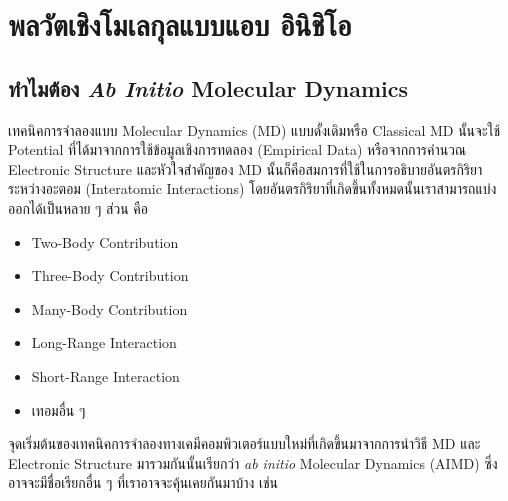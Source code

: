 

\chapter{พลวัตเชิงโมเลกุลแบบแอบ อินิชิโอ}
\label{ch:aimd}

\section{ทำไมต้อง \textit{Ab Initio} Molecular Dynamics}

เทคนิคการจำลองแบบ Molecular Dynamics (MD) แบบดั้งเดิมหรือ Classical MD นั้นจะใช้ Potential ที่ได้มาจากการใช้ข้อมูลเชิงการทดลอง
(Empirical Data) หรือจากการคำนวณ Electronic Structure และหัวใจสำคัญของ MD นั้นก็คือสมการที่ใช้ในการอธิบายอันตรกิริยาระหว่างอะตอม
(Interatomic Interactions) โดยอันตรกิริยาที่เกิดขึ้นทั้งหมดนั้นเราสามารถแบ่งออกได้เป็นหลาย ๆ ส่วน คือ

\begin{itemize}[topsep=0pt,noitemsep]
  \setlength\itemsep{0.5em}
  \item Two-Body Contribution

  \item Three-Body Contribution

  \item Many-Body Contribution

  \item Long-Range Interaction

  \item Short-Range Interaction

  \item เทอมอื่น ๆ
\end{itemize}

จุดเริ่มต้นของเทคนิคการจำลองทางเคมีคอมพิวเตอร์แบบใหม่ที่เกิดขึ้นมาจากการนำวิธี MD และ Electronic Structure มารวมกันนั้นเรียกว่า
\textit{ab initio} Molecular Dynamics (AIMD) ซึ่งอาจจะมีชื่อเรียกอื่น ๆ ที่เราอาจจะคุ้นเคยกันมาบ้าง เช่น

